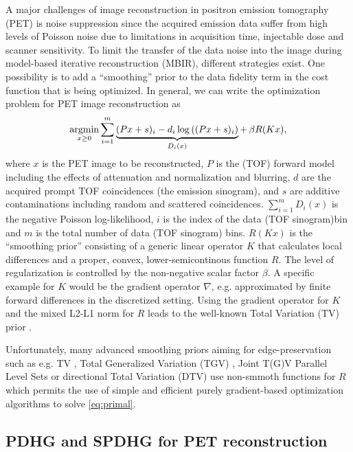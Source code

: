 A major challenges of image reconstruction in positron emission tomography (PET)
is noise suppression since the acquired emission data suffer from high levels of Poisson
noise due to limitations in acquisition time, injectable dose and scanner sensitivity.
To limit the transfer of the data noise into the image during model-based iterative
reconstruction (MBIR), different strategies exist. 
One possibility is to add a ``smoothing'' prior to the data fidelity term in the cost
function that is being optimized.
In general, we can write the optimization problem for PET image reconstruction as
%
\begin{equation}
\operatorname*{argmin} _{x\geq 0} \sum_{i=1}^{m} \underbrace{(Px + s)_i -  d_i \log \left( (Px + s)_i \right)}_{D_i(x)} + \, \beta R(Kx),
\label{eq:primal}
\end{equation}
%
where $x$ is the PET image to be reconstructed, $P$ is the (TOF) forward model including the effects
of attenuation and normalization and blurring, $d$ are the acquired prompt TOF coincidences 
(the emission sinogram), and $s$ are additive contaminations including random and 
scattered coincidences. 
$\sum_{i=1}^m D_i(x)$ is the negative Poisson log-likelihood, $i$ is the index of the data (TOF sinogram)bin and $m$ is the total number of data (TOF sinogram) bins.
$R(Kx)$ is the ``smoothing prior'' consisting of a generic linear operator $K$ that calculates 
local differences and a proper, convex, lower-semicontinous function $R$.
The level of regularization is controlled by the non-negative scalar factor $\beta$.
A specific example for $K$ would be the gradient operator $\nabla$, e.g. approximated by finite forward 
differences in the discretized setting.
Using the gradient operator for $K$ and the mixed L2-L1 norm for $R$ leads to the well-known 
Total Variation (TV) prior \cite{Rudin1992}.

Unfortunately, many advanced smoothing priors aiming for edge-preservation 
such as e.g. TV \cite{Rudin1992}, Total Generalized Variation (TGV) 
\cite{Bredies2010}, Joint T(G)V \cite{Rigie2015,Knoll2016}
Parallel Level Sets \cite{Ehrhardt2016a,Schramm2017} or directional Total Variation (DTV)
\cite{Ehrhardt2016} use non-smmoth functions for $R$ which permits the use of simple and efficient 
purely gradient-based optimization algorithms to solve \eqref{eq:primal}.

\subsection*{PDHG and SPDHG for PET reconstruction}

